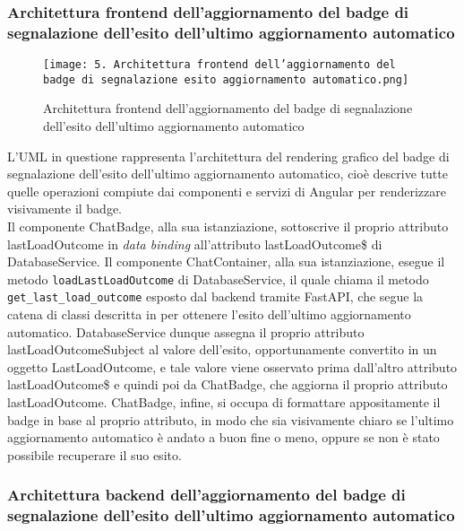 \newpage


\subsubsection{Architettura frontend dell’aggiornamento del badge di segnalazione dell’esito dell’ultimo aggiornamento automatico}
\label{sec:architettura_frontend_badge_aggiornamento}

\begin{figure}[h]
    \centering
    \texttt{[image: 5. Architettura frontend dell'aggiornamento del badge di segnalazione esito aggiornamento automatico.png]}
    \caption{Architettura frontend dell’aggiornamento del badge di segnalazione dell’esito dell’ultimo aggiornamento automatico}
\end{figure}

L'UML in questione rappresenta l'architettura del rendering grafico del badge di segnalazione dell'esito dell'ultimo aggiornamento automatico, cioè descrive tutte quelle operazioni compiute dai componenti e servizi di Angular per renderizzare visivamente il badge.\\
Il componente ChatBadge, alla sua istanziazione, sottoscrive il proprio attributo lastLoadOutcome in \emph{data binding} all'attributo lastLoadOutcome\$ di DatabaseService. Il componente ChatContainer, alla sua istanziazione, esegue il metodo \texttt{loadLastLoadOutcome} di DatabaseService, il quale chiama il metodo \texttt{get\_last\_load\_outcome} esposto dal backend tramite FastAPI, che segue la catena di classi descritta in  per ottenere l'esito dell'ultimo aggiornamento automatico. DatabaseService dunque assegna il proprio attributo lastLoadOutcomeSubject al valore dell'esito, opportunamente convertito in un oggetto LastLoadOutcome, e tale valore viene osservato prima dall'altro attributo lastLoadOutcome\$ e quindi poi da ChatBadge, che aggiorna il proprio attributo lastLoadOutcome. ChatBadge, infine, si occupa di formattare appositamente il badge in base al proprio attributo, in modo che sia visivamente chiaro se l'ultimo aggiornamento automatico è andato a buon fine o meno, oppure se non è stato possibile recuperare il suo esito.

\newpage


\subsubsection{Architettura backend dell’aggiornamento del badge di segnalazione dell’esito dell’ultimo aggiornamento automatico}
\label{sec:architettura_backend_badge_aggiornamento}

